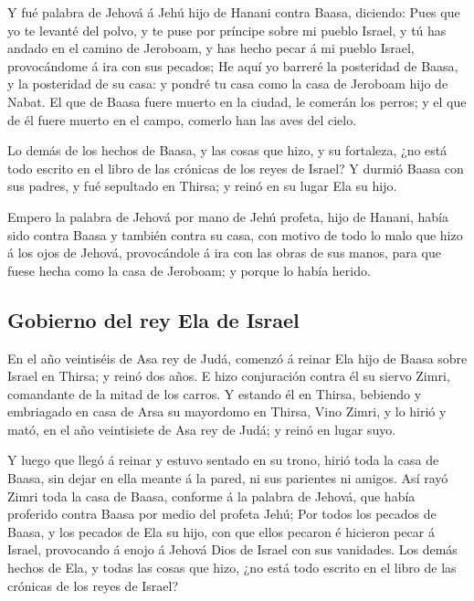  Y fué palabra de Jehová á Jehú hijo de Hanani contra
Baasa, diciendo:  Pues que yo te levanté del polvo, y te
puse por príncipe sobre mi pueblo Israel, y tú has andado en el camino
de Jeroboam, y has hecho pecar á mi pueblo Israel, provocándome á ira
con sus pecados;  He aquí yo barreré la posteridad de
Baasa, y la posteridad de su casa: y pondré tu casa como la casa de
Jeroboam hijo de Nabat.  El que de Baasa fuere muerto en
la ciudad, le comerán los perros; y el que de él fuere muerto en el
campo, comerlo han las aves del cielo.

 Lo demás de los hechos de Baasa, y las cosas que hizo, y
su fortaleza, ¿no está todo escrito en el libro de las crónicas de los
reyes de Israel?  Y durmió Baasa con sus padres, y fué
sepultado en Thirsa; y reinó en su lugar Ela su hijo.

 Empero la palabra de Jehová por mano de Jehú profeta,
hijo de Hanani, había sido contra Baasa y también contra su casa, con
motivo de todo lo malo que hizo á los ojos de Jehová, provocándole á ira
con las obras de sus manos, para que fuese hecha como la casa de
Jeroboam; y porque lo había herido.

\hypertarget{gobierno-del-rey-ela-de-israel}{%
\subsection{Gobierno del rey Ela de
Israel}\label{gobierno-del-rey-ela-de-israel}}

 En el año veintiséis de Asa rey de Judá, comenzó á reinar
Ela hijo de Baasa sobre Israel en Thirsa; y reinó dos años.
 E hizo conjuración contra él su siervo Zimri, comandante
de la mitad de los carros. Y estando él en Thirsa, bebiendo y embriagado
en casa de Arsa su mayordomo en Thirsa,  Vino Zimri, y lo
hirió y mató, en el año veintisiete de Asa rey de Judá; y reinó en lugar
suyo.

 Y luego que llegó á reinar y estuvo sentado en su trono,
hirió toda la casa de Baasa, sin dejar en ella meante á la pared, ni sus
parientes ni amigos.  Así rayó Zimri toda la casa de
Baasa, conforme á la palabra de Jehová, que había proferido contra Baasa
por medio del profeta Jehú;  Por todos los pecados de
Baasa, y los pecados de Ela su hijo, con que ellos pecaron é hicieron
pecar á Israel, provocando á enojo á Jehová Dios de Israel con sus
vanidades.  Los demás hechos de Ela, y todas las cosas
que hizo, ¿no está todo escrito en el libro de las crónicas de los reyes
de Israel?

